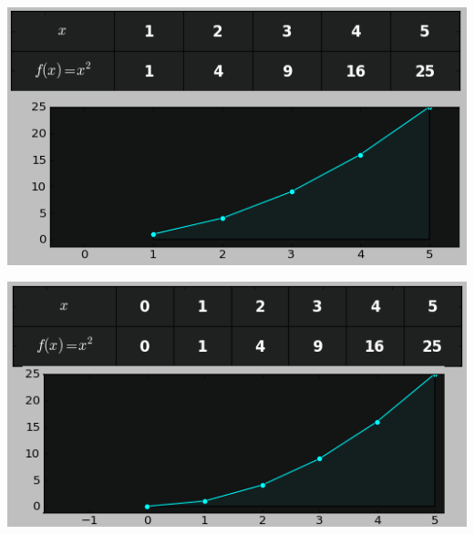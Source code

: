 \documentclass{article}
\begin{document}
\begin{minipage}[t]{0.49\textwidth}
\includegraphics[width=\textwidth]{graphsnip1.png}
\end{minipage}
\begin{minipage}[t]{0.48\textwidth}
\includegraphics[width=\textwidth]{graphsnip2.png}
\end{minipage}
\end{document}
